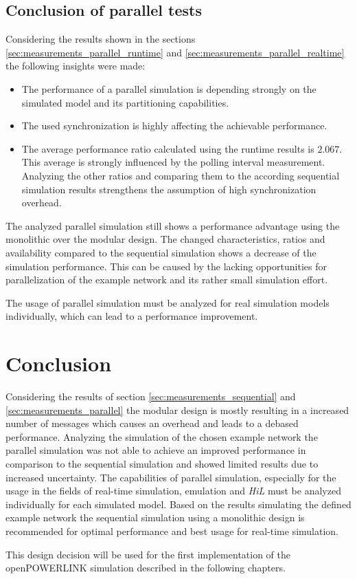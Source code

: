 \subsection{Conclusion of parallel tests}

Considering the results shown in the sections \ref{sec:measurements_parallel_runtime} and \ref{sec:measurements_parallel_realtime} the following insights were made:

\begin{itemize}
    \item The performance of a parallel simulation is depending strongly on the simulated model and its partitioning capabilities.
    \item The used synchronization is highly affecting the achievable performance.
    \item The average performance ratio calculated using the runtime results is $2.067$.
    This average is strongly influenced by the polling interval measurement.
    Analyzing the other ratios and comparing them to the according sequential simulation results strengthens the assumption of high synchronization overhead.
\end{itemize}

The analyzed parallel simulation still shows a performance advantage using the monolithic over the modular design.
The changed characteristics, ratios and availability compared to the sequential simulation shows a decrease of the simulation performance.
This can be caused by the lacking opportunities for parallelization of the example network and its rather small simulation effort.

The usage of parallel simulation must be analyzed for real simulation models individually, which can lead to a performance improvement.

\section{Conclusion}
Considering the results of section \ref{sec:measurements_sequential} and \ref{sec:measurements_parallel} the modular design is mostly resulting in a increased number of messages which causes an overhead and leads to a debased performance.
Analyzing the simulation of the chosen example network the parallel simulation was not able to achieve an improved performance in comparison to the sequential simulation and showed limited results due to increased uncertainty.
The capabilities of parallel simulation, especially for the usage in the fields of real-time simulation, emulation and \emph{HiL} must be analyzed individually for each simulated model.
Based on the results simulating the defined example network the sequential simulation using a monolithic design is recommended for optimal performance and best usage for real-time simulation.

This design decision will be used for the first implementation of the openPOWERLINK simulation described in the following chapters.